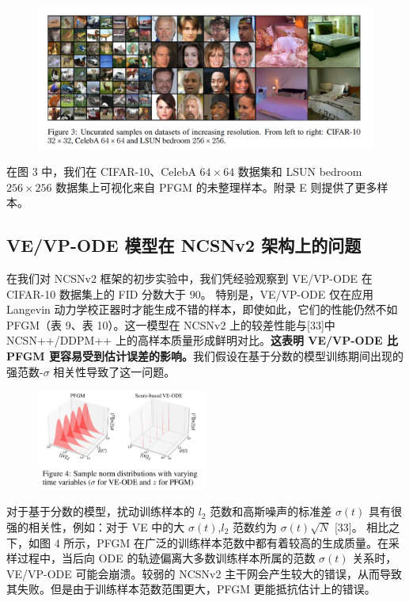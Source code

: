 \documentclass[hyperref,UTF-8]{ctexart}
\newcommand{\0}{\boldsymbol{0}}
\begin{document}
\begin{figure}[ht]
  \centering
  \includegraphics[width=1\textwidth]{img/figure3.png}
\end{figure}

在图 $3$ 中，我们在 CIFAR-10、CelebA $64 \times 64$ 数据集和 LSUN bedroom $256 \times 256$ 数据集上可视化来自 PFGM 的未整理样本。附录 E 则提供了更多样本。

\subsection{ VE/VP-ODE 模型在 NCSNv2 架构上的问题}

在我们对 NCSNv2 框架的初步实验中，我们凭经验观察到 VE/VP-ODE 在 CIFAR-10 数据集上的 FID 分数大于 $90$。 特别是，VE/VP-ODE 仅在应用 Langevin 动力学校正器时才能生成不错的样本，即使如此，它们的性能仍然不如 PFGM（表 9、表 10）。这一模型在 NCSNv2 上的较差性能与[33]中 NCSN++/DDPM++ 上的高样本质量形成鲜明对比。\textbf{这表明 VE/VP-ODE 比 PFGM 更容易受到估计误差的影响。}我们假设在基于分数的模型训练期间出现的强范数-$\sigma$ 相关性导致了这一问题。

\begin{figure}[ht]
  \centering
  \includegraphics[width=0.5\textwidth]{img/figure4.png}
\end{figure}

对于基于分数的模型，扰动训练样本的 $l_2$ 范数和高斯噪声的标准差 $\sigma(t)$ 具有很强的相关性，例如：对于 VE 中的大 $\sigma(t)$,$l_2$ 范数约为 $\sigma(t)\sqrt{N}$ [33]。 相比之下，如图 4 所示，PFGM 在广泛的训练样本范数中都有着较高的生成质量。在采样过程中，当后向 ODE 的轨迹偏离大多数训练样本所属的范数 $\sigma(t)$ 关系时，VE/VP-ODE 可能会崩溃。较弱的 NCSNv2 主干网会产生较大的错误，从而导致其失败。但是由于训练样本范数范围更大，PFGM 更能抵抗估计上的错误。
\end{document}
